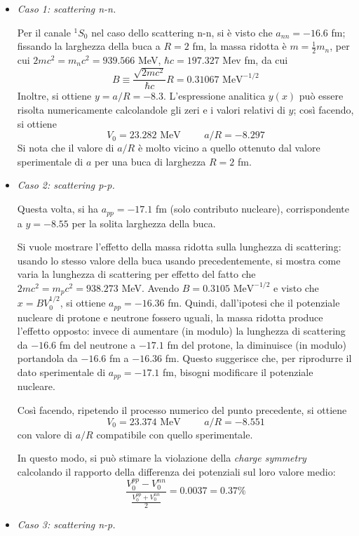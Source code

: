 \documentclass[11pt, a4paper]{scrartcl}
\theoremstyle{style}
\numberwithin{equation}{subsection}
\begin{document}
\begin{itemize}
	\item \textit{Caso 1: scattering n-n.} 


		Per il canale $^{1}S_0$ nel caso dello scattering n-n, si \`e visto che $a_{nn} = -16.6$ fm; fissando la larghezza della buca a $R = 2 $ fm, la massa ridotta \`e $m = \frac{1}{2} m_n$, per cui $2m c^2 = m_nc^2 = 939.566$ MeV, $\hbar c = 197.327$ Mev fm, da cui 
		\[
		B \equiv \frac{\sqrt{2 m c^2} }{\hbar c}R = 0.31067 \text{ MeV}^{-1 / 2}
		\] 
	Inoltre, si ottiene $y = a / R = - 8 .3$. 
	L'espressione analitica $y(x)$ pu\`o essere risolta numericamente calcolandole gli zeri e i valori relativi di $y$; cos\`i facendo, si ottiene 
	\[
	V_0 = 23.282 \text{ MeV} \hspace{1cm}a / R = -8.297
	\] 
	Si nota che il valore di $a / R$ \`e molto vicino a quello ottenuto dal valore sperimentale di $a$ per una buca di larghezza $R= 2$ fm.
\item \textit{Caso 2: scattering p-p.} 

	Questa volta, si ha $a _{pp} = -17.1$ fm (solo contributo nucleare), corrispondente a $y = -8.55$ per la solita larghezza della buca.

	Si vuole mostrare l'effetto della massa ridotta sulla lunghezza di scattering: usando lo stesso valore della buca usando precedentemente, si mostra come varia la lunghezza di scattering per effetto del fatto che $2 m c ^2 = m_p c^2 = 938.273$ MeV.
	Avendo $B = 0.3105\text{ MeV}^{-1 / 2}$ e visto che $x = B V_0^{1 / 2}$, si ottiene $a_{pp} = -16.36$ fm.
	Quindi, dall'ipotesi che il potenziale nucleare di protone e neutrone fossero uguali, la massa ridotta produce l'effetto opposto: invece di aumentare (in modulo) la lunghezza di scattering da $-16.6$ fm del neutrone a $-17.1$ fm del protone, la diminuisce (in modulo) portandola da $-16.6$ fm a $-16.36$ fm.
	Questo suggerisce che, per riprodurre il dato sperimentale di $a_{pp} = -17.1$ fm, bisogni modificare il potenziale nucleare.

	Cos\`i facendo, ripetendo il processo numerico del punto precedente, si ottiene 
	\[
	V_0 = 23.374\text{ MeV} \hspace{1cm} a / R = - 8.551
	\] 
	con valore di $a / R$ compatibile con quello sperimentale.

	In questo modo, si pu\`o stimare la violazione della \textit{charge symmetry} calcolando il rapporto della differenza dei potenziali sul loro valore medio:
	\begin{equation}
		\frac{V_0^{pp} - V_0^{nn}}{\frac{V_0^{pp}+V_0^{nn}}{2}} = 0.0037 = 0.37 \%
	\end{equation}
\item \textit{Caso 3: scattering n-p.} 


\end{itemize}
\end{document}

